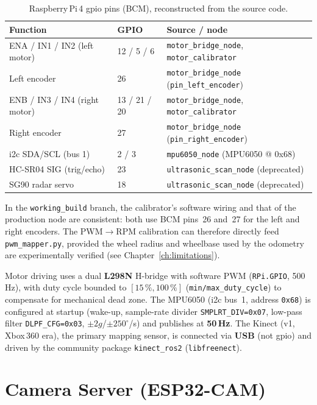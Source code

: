 \begin{table}[H]
	\centering
	\caption{Raspberry\,Pi\,4 \gls{gpio} pins (BCM), reconstructed from the source code.}
	\label{tab:gpio_pinout}
	\begin{tabularx}{\linewidth}{L{3.8cm} C{1.6cm} L{6.8cm}}
		\toprule
		\textbf{Function} & \textbf{GPIO} & \textbf{Source / node} \\
		\midrule
		ENA / IN1 / IN2 (left motor) & 12 / 5 / 6 & \texttt{motor\_bridge\_node}, \texttt{motor\_calibrator} \\
		Left encoder & 26 & \texttt{motor\_bridge\_node} (\texttt{pin\_left\_encoder}) \\
		ENB / IN3 / IN4 (right motor) & 13 / 21 / 20 & \texttt{motor\_bridge\_node}, \texttt{motor\_calibrator} \\
		Right encoder & 27 & \texttt{motor\_bridge\_node} (\texttt{pin\_right\_encoder}) \\
		\gls{i2c} SDA/SCL (bus 1) & 2 / 3 & \texttt{mpu6050\_node} (MPU6050 @ 0x68) \\
		HC-SR04 SIG (trig/echo) & 23 & \texttt{ultrasonic\_scan\_node} (deprecated) \\
		SG90 radar servo & 18 & \texttt{ultrasonic\_scan\_node} (deprecated) \\
		\bottomrule
	\end{tabularx}
\end{table}

In the \texttt{working\_build} branch, the calibrator's software wiring and that of the
production node are consistent: both use BCM pins~26 and~27 for the left and right
encoders. The PWM$\to$RPM calibration can therefore directly feed
\texttt{pwm\_mapper.py}, provided the wheel radius and wheelbase used by the odometry are
experimentally verified (see Chapter~\ref{ch:limitations}).

Motor driving uses a dual \textbf{L298N} H-bridge with software PWM (\texttt{RPi.GPIO},
500\,Hz), with duty cycle bounded to $[15\,\%,100\,\%]$
(\texttt{min/max\_duty\_cycle}) to compensate for mechanical dead zone. The MPU6050
(\gls{i2c} bus~1, address \texttt{0x68}) is configured at startup (wake-up, sample-rate
divider \texttt{SMPLRT\_DIV=0x07}, low-pass filter \texttt{DLPF\_CFG=0x03},
$\pm2g$/$\pm250^\circ$/s) and publishes at \textbf{50\,Hz}. The Kinect (v1, Xbox\,360
era), the primary mapping sensor, is connected via \textbf{USB} (not \gls{gpio}) and
driven by the community package \texttt{kinect\_ros2} (\texttt{libfreenect}).

\section{Camera Server (ESP32-CAM)}
\label{sec:elec_esp32cam}

